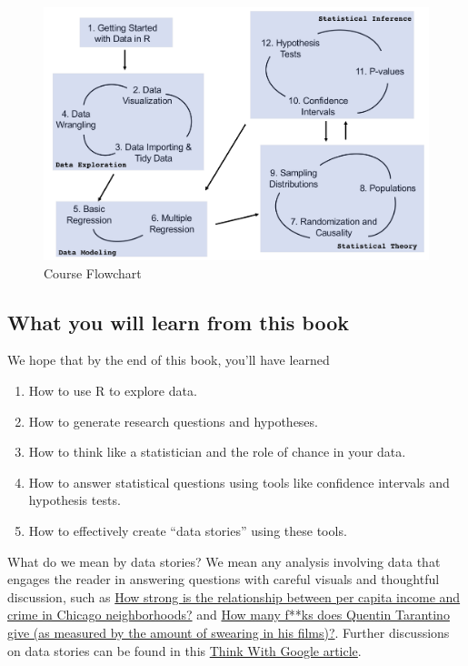\documentclass[
  letterpaper,
  DIV=11,
  numbers=noendperiod]{scrreprt}
\providecommand{\tightlist}{%
  \setlength{\itemsep}{0pt}\setlength{\parskip}{0pt}}\usepackage{longtable,booktabs,array}
\theoremstyle{definition}
\theoremstyle{remark}
\begin{document}
\begin{figure}

{\centering \includegraphics{images/flowcharts/STAT_202_Diagram-1.png}

}

\caption{\label{fig-course-flowchart}Course Flowchart}

\end{figure}

\hypertarget{what-you-will-learn-from-this-book}{%
\subsection*{What you will learn from this
book}\label{what-you-will-learn-from-this-book}}

We hope that by the end of this book, you'll have learned

\begin{enumerate}
\def\labelenumi{\arabic{enumi}.}
\tightlist
\item
  How to use R to explore data.
\item
  How to generate research questions and hypotheses.
\item
  How to think like a statistician and the role of chance in your data.
\item
  How to answer statistical questions using tools like confidence
  intervals and hypothesis tests.
\item
  How to effectively create ``data stories'' using these tools.
\end{enumerate}

What do we mean by data stories? We mean any analysis involving data
that engages the reader in answering questions with careful visuals and
thoughtful discussion, such as
\href{http://rpubs.com/ry_lisa_elana/chicago}{How strong is the
relationship between per capita income and crime in Chicago
neighborhoods?} and
\href{https://ismayc.github.io/soc301_s2017/group_projects/group4.html}{How
many f**ks does Quentin Tarantino give (as measured by the amount of
swearing in his films)?}. Further discussions on data stories can be
found in this
\href{https://www.thinkwithgoogle.com/marketing-resources/data-measurement/tell-meaningful-stories-with-data/}{Think
With Google article}.
\end{document}
